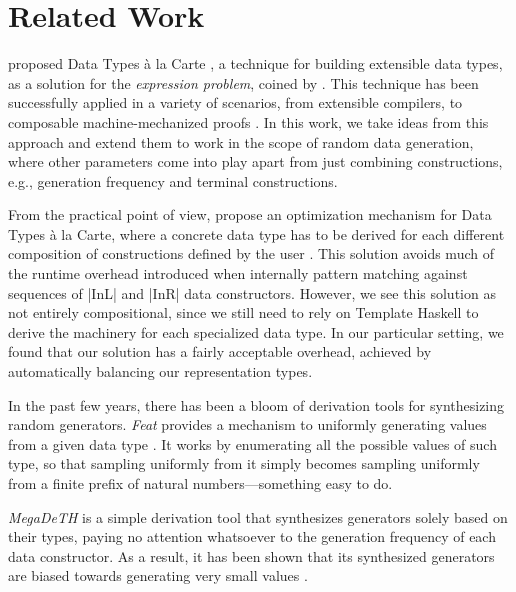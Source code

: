 \section{Related Work}
\label{sec:related}

\citeauthor{SwierstraDTC} proposed Data Types \`a la Carte \cite{SwierstraDTC},
a technique for building extensible data types, as a solution for the
\emph{expression problem}, coined by \citeauthor{wadler1998expression}
\cite{wadler1998expression}.
%
This technique has been successfully applied in a variety of scenarios, from
extensible compilers, to composable machine-mechanized proofs
\cite{Day:2013:CAL:2620678.2620680, persson2011generic, wu2014effect,
  delaware2013meta}.
%
In this work, we take ideas from this approach and extend them to work in the
scope of random data generation, where other parameters come into play apart
from just combining constructions, e.g., generation frequency and terminal
constructions.


From the practical point of view, \citeauthor{KiriyamaOptimizingDTC} propose an
optimization mechanism for Data Types \`a la Carte, where a concrete data type
has to be derived for each different composition of constructions defined by the
user \cite{KiriyamaOptimizingDTC}.
%
This solution avoids much of the runtime overhead introduced when internally
pattern matching against sequences of |InL| and |InR| data constructors.
%
However, we see this solution as not entirely compositional, since we still need
to rely on Template Haskell to derive the machinery for each specialized data
type.
%
In our particular setting, we found that our solution has a fairly acceptable
overhead, achieved by automatically balancing our representation types.


In the past few years, there has been a bloom of derivation tools for
synthesizing random generators.
%
\emph{Feat} provides a mechanism to uniformly generating values from a given
data type \cite{DuregardJW12}.
%
It works by enumerating all the possible values of such type, so that sampling
uniformly from it simply becomes sampling uniformly from a finite prefix of
natural numbers---something easy to do.


\emph{MegaDeTH} is a simple derivation tool that synthesizes generators solely
based on their types, paying no attention whatsoever to the generation frequency
of each data constructor.
%
As a result, it has been shown that its synthesized generators are biased
towards generating very small values
\cite{DBLP:conf/haskell/MistaRH18}.


